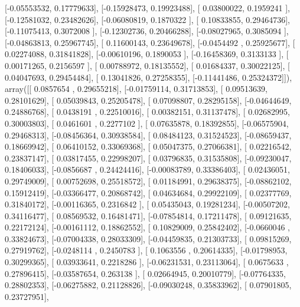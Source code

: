 \documentclass{article}
\begin{document}
       [-0.05553532,  0.17779633],
       [-0.15928473,  0.19923488],
       [ 0.03800022,  0.1959241 ],
       [-0.12581032,  0.23482626],
       [-0.06080819,  0.1870322 ],
       [ 0.10833855,  0.29464736],
       [-0.11075413,  0.3072008 ],
       [-0.12302736,  0.20466288],
       [-0.08027965,  0.3085094 ],
       [-0.04863813,  0.25967745],
       [ 0.11600143,  0.23649678],
       [-0.0454492 ,  0.25925677],
       [ 0.02274088,  0.31841828],
       [-0.00610196,  0.1890053 ],
       [-0.16458369,  0.3133133 ],
       [ 0.00171265,  0.2156597 ],
       [ 0.00788972,  0.18135552],
       [ 0.01684337,  0.30022125],
       [ 0.04047693,  0.29454484],
       [ 0.13041826,  0.27258355],
       [-0.11441486,  0.25324372]]), array([[ 0.0857654 ,  0.29655218],
       [-0.01759114,  0.31713853],
       [ 0.09513639,  0.28101629],
       [ 0.05039843,  0.25205478],
       [ 0.07098807,  0.28295158],
       [-0.04644649,  0.24886768],
       [ 0.0438191 ,  0.22510016],
       [ 0.00382151,  0.31137478],
       [ 0.02682995,  0.30003803],
       [ 0.0461601 ,  0.2277102 ],
       [ 0.07635878,  0.18392855],
       [-0.06575904,  0.29468313],
       [-0.08456364,  0.30938584],
       [ 0.08484123,  0.31524523],
       [-0.08659437,  0.18669942],
       [ 0.06410152,  0.33069368],
       [ 0.05047375,  0.27066381],
       [ 0.02216542,  0.23837147],
       [ 0.03817455,  0.22998207],
       [ 0.03796835,  0.31535808],
       [-0.09230047,  0.18406033],
       [-0.0856687 ,  0.24424416],
       [-0.00083789,  0.33386403],
       [ 0.02436051,  0.29749009],
       [ 0.00752698,  0.25518572],
       [ 0.01184991,  0.29638375],
       [-0.08862102,  0.15912419],
       [-0.03366477,  0.20868742],
       [ 0.04634684,  0.29922109],
       [ 0.02377769,  0.31840172],
       [-0.00116365,  0.2316842 ],
       [ 0.05435043,  0.19281234],
       [-0.00507202,  0.34116477],
       [ 0.08569532,  0.16481471],
       [-0.07854814,  0.17211478],
       [ 0.09121635,  0.22172124],
       [-0.00161112,  0.18862552],
       [ 0.10829009,  0.25842402],
       [-0.0660046 ,  0.33824673],
       [-0.07004338,  0.28033309],
       [-0.04459835,  0.21303733],
       [ 0.09815269,  0.27919762],
       [-0.0248114 ,  0.2450783 ],
       [ 0.1063556 ,  0.20614335],
       [-0.01798953,  0.30299365],
       [ 0.03933641,  0.2218286 ],
       [-0.06231531,  0.23113064],
       [ 0.0675633 ,  0.27896415],
       [-0.03587654,  0.263138  ],
       [ 0.02664945,  0.20010779],
       [-0.07764335,  0.28802353],
       [-0.06275882,  0.21128826],
       [-0.09030248,  0.35833962],
       [ 0.07901805,  0.23727951],
\end{document}
